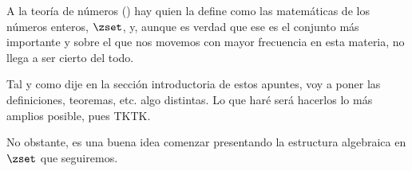 


A la teoría de números () hay quien la define como las
matemáticas de los números enteros, $\zset$, y, aunque es verdad que ese es
el conjunto más importante y sobre el que nos movemos con mayor frecuencia
en esta materia, no llega a ser cierto del todo.

Tal y como dije en la sección introductoria de estos apuntes, voy a poner
las definiciones, teoremas, etc. algo distintas. Lo que haré será hacerlos
lo más amplios posible, pues TKTK.

No obstante, es una buena idea comenzar presentando la estructura algebraica
en $\zset$ que seguiremos. 



